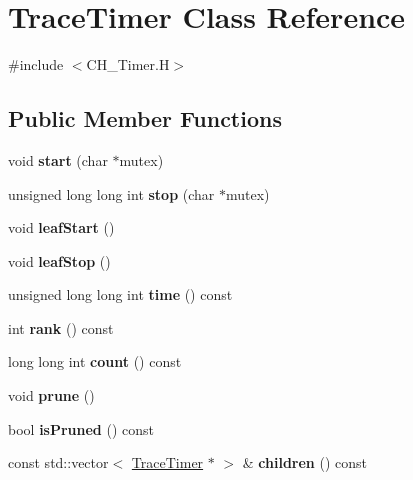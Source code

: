 \hypertarget{classTraceTimer}{}\section{Trace\+Timer Class Reference}
\label{classTraceTimer}


{\ttfamily \#include $<$C\+H\+\_\+\+Timer.\+H$>$}

\subsection*{Public Member Functions}
\begin{DoxyCompactItemize}
\item 
\hypertarget{classTraceTimer_a03205e8ad8c9ce4564d686707f82fe84}{}void {\bfseries start} (char $\ast$mutex)\label{classTraceTimer_a03205e8ad8c9ce4564d686707f82fe84}

\item 
\hypertarget{classTraceTimer_a690e043d786547decec8c483cf662ca1}{}unsigned long long int {\bfseries stop} (char $\ast$mutex)\label{classTraceTimer_a690e043d786547decec8c483cf662ca1}

\item 
\hypertarget{classTraceTimer_adf7648634d5812e6d9d5de15f00e8314}{}void {\bfseries leaf\+Start} ()\label{classTraceTimer_adf7648634d5812e6d9d5de15f00e8314}

\item 
\hypertarget{classTraceTimer_a79a39ed75671663311d05fcfbb9c4ad7}{}void {\bfseries leaf\+Stop} ()\label{classTraceTimer_a79a39ed75671663311d05fcfbb9c4ad7}

\item 
\hypertarget{classTraceTimer_a3444db7e0d172bc7af48b06a252c7280}{}unsigned long long int {\bfseries time} () const \label{classTraceTimer_a3444db7e0d172bc7af48b06a252c7280}

\item 
\hypertarget{classTraceTimer_a679c13c59b83fa01f49c5d5b06509718}{}int {\bfseries rank} () const \label{classTraceTimer_a679c13c59b83fa01f49c5d5b06509718}

\item 
\hypertarget{classTraceTimer_a9bb6e59b5595ef2304e1054c7fc5b38c}{}long long int {\bfseries count} () const \label{classTraceTimer_a9bb6e59b5595ef2304e1054c7fc5b38c}

\item 
\hypertarget{classTraceTimer_a368f32b604ecd500afb084851e8c51ce}{}void {\bfseries prune} ()\label{classTraceTimer_a368f32b604ecd500afb084851e8c51ce}

\item 
\hypertarget{classTraceTimer_ae9de90ae7a635f77a2eca9911853888d}{}bool {\bfseries is\+Pruned} () const \label{classTraceTimer_ae9de90ae7a635f77a2eca9911853888d}

\item 
\hypertarget{classTraceTimer_afda09014b2657611d6918bcc9b8b6943}{}const std\+::vector$<$ \hyperlink{classTraceTimer}{Trace\+Timer} $\ast$ $>$ \& {\bfseries children} () const \label{classTraceTimer_afda09014b2657611d6918bcc9b8b6943}

\end{DoxyCompactItemize}
